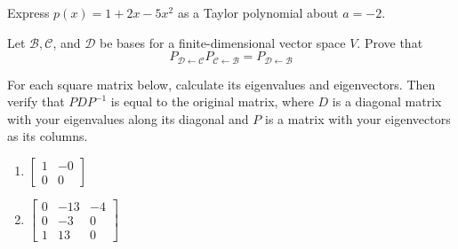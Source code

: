 \documentclass[12pt,letterpaper]{hmcpset}
\newcommand{\m}[1]{\begin{bmatrix} #1 \end{bmatrix}}
\begin{document}
\begin{problem}[6.3.18]
    Express $p(x)=1+2x-5x^2$ as a Taylor polynomial about $a=-2$.
\end{problem}
\begin{solution}
    \vfill
\end{solution}
\newpage

\begin{problem}[6.3.21]
    Let $\mathcal{B},\mathcal{C}$, and $\mathcal{D}$ be bases for a
    finite-dimensional vector space $V$. Prove that
    $$P_{\mathcal{D}\leftarrow\mathcal{C}}P_{\mathcal{C}\leftarrow\mathcal{B}}
    =P_{\mathcal{D}\leftarrow\mathcal{B}}$$
\end{problem}
\begin{solution}
    \vfill
\end{solution}
\newpage

\begin{problem}
    For each square matrix below, calculate its eigenvalues and eigenvectors.
    Then verify that $PDP^{-1}$ is equal to the original matrix, where $D$ is a
    diagonal matrix with your eigenvalues along its diagonal and $P$ is a matrix
    with your eigenvectors as its columns.
    \begin{enumerate}
        \item $\m{1&-0\\0&0}$
        \item $\m{0&-13&-4\\0&-3&0\\1&13&0}$
    \end{enumerate}
\end{problem}
\begin{solution}
    \vfill
\end{solution}
\end{document}
